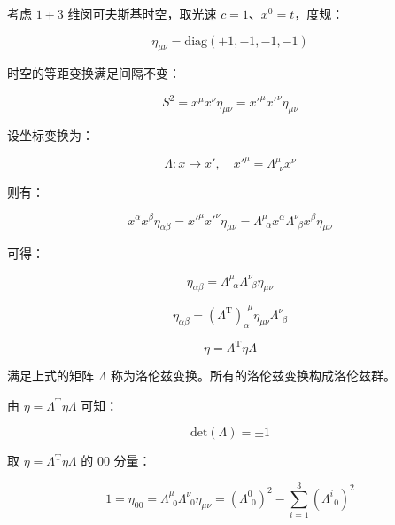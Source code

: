 考虑 $1+3$ 维闵可夫斯基时空，取光速 $c=1$、$x^0=t$，度规：

\begin{equation}
\eta_{\mu\nu}
=\mathrm{diag}\left(+1,-1,-1,-1\right)
\end{equation}

时空的等距变换满足间隔不变：

\begin{equation}
S^2
=x^\mu x^\nu \eta_{\mu\nu}
=x'^{\mu} x'^{\nu} \eta_{\mu\nu}
\end{equation}

设坐标变换为：

\begin{equation}
\Lambda:x\to x',\quad
x'^{\mu} = \Lambda^{\mu}_{~~\nu} x^\nu
\end{equation}

则有：

\begin{equation}
x^\alpha x^\beta \eta_{\alpha\beta}
=x'^{\mu} x'^{\nu} \eta_{\mu\nu}
=\Lambda^\mu_{~~\alpha} x^\alpha \Lambda^\nu_{~~\beta} x^\beta \eta_{\mu\nu}
\end{equation}

可得：

\begin{equation}
\eta_{\alpha\beta}
=\Lambda^\mu_{~~\alpha}\Lambda^\nu_{~~\beta}\eta_{\mu\nu}
\end{equation}

\begin{equation}
\eta_{\alpha\beta}
=\left(\Lambda^{\mathrm{T}} \right)_\alpha^{~~\mu} \eta_{\mu\nu}\Lambda^\nu_{~~\beta}
\end{equation}

\begin{equation}
\eta
=\Lambda^{\mathrm{T}} \eta \Lambda
\end{equation}

满足上式的矩阵 $\Lambda$ 称为洛伦兹变换。所有的洛伦兹变换构成洛伦兹群。

由 $\eta=\Lambda^{\mathrm{T}} \eta \Lambda$ 可知：

\begin{equation}
\mathrm{det}\left(\Lambda\right) = \pm 1
\end{equation}

取 $\eta=\Lambda^{\mathrm{T}} \eta \Lambda$ 的 $00$ 分量：

\begin{equation}
1=\eta_{00}=\Lambda^\mu_{~~0}\Lambda^\nu_{~~0}\eta_{\mu\nu}
=\left(\Lambda^0_{~~0} \right)^2 - \sum_{i=1}^{3} \left(\Lambda^i_{~~0} \right)^2
\end{equation}

